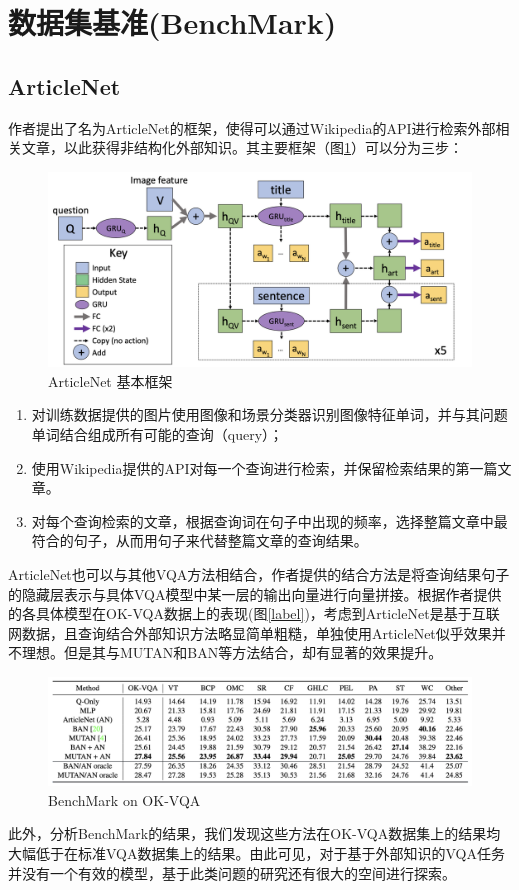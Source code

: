 \documentclass[conference,10pt]{IEEEtran}
\begin{document}
\section{数据集基准(BenchMark)}

\subsection{ArticleNet}
作者提出了名为ArticleNet的框架，使得可以通过Wikipedia的API进行检索外部相关文章，以此获得非结构化外部知识。其主要框架（图\ref{ArticleNet}）可以分为三步：
\begin{figure}
	\centering
	\includegraphics[scale=0.28]{figure/ArticleNet.png}
	\caption{ArticleNet 基本框架}
	\label{ArticleNet}
\end{figure}
\begin{enumerate}
	\item 对训练数据提供的图片使用图像和场景分类器识别图像特征单词，并与其问题单词结合组成所有可能的查询（query）；
	\item 使用Wikipedia提供的API对每一个查询进行检索，并保留检索结果的第一篇文章。
	\item 对每个查询检索的文章，根据查询词在句子中出现的频率，选择整篇文章中最符合的句子，从而用句子来代替整篇文章的查询结果。
\end{enumerate}
ArticleNet也可以与其他VQA方法相结合，作者提供的结合方法是将查询结果句子的隐藏层表示与具体VQA模型中某一层的输出向量进行向量拼接。根据作者提供的各具体模型在OK-VQA数据上的表现(图\ref{label})，考虑到ArticleNet是基于互联网数据，且查询结合外部知识方法略显简单粗糙，单独使用ArticleNet似乎效果并不理想。但是其与MUTAN和BAN等方法结合，却有显著的效果提升。
\begin{figure}[H]
	\centering
	\includegraphics[scale=0.3]{figure/benchmark.png}
	\caption{BenchMark on OK-VQA}
	\label{benchmark}
\end{figure}
此外，分析BenchMark的结果，我们发现这些方法在OK-VQA数据集上的结果均大幅低于在标准VQA数据集上的结果。由此可见，对于基于外部知识的VQA任务并没有一个有效的模型，基于此类问题的研究还有很大的空间进行探索。
\end{document}
